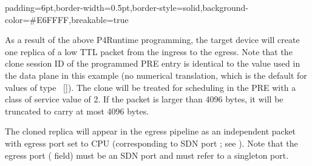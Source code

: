 \documentclass[11pt]{article}
\begin{document}
{%
\begin{mdbmargintb}{6pt}{6pt}%
\begin{mdblock}{padding=6pt,border-width=0.5pt,border-style=solid,background-color=\#E6FFFF,breakable=true}%
\begin{mdpre}%
\end{mdpre}%
\end{mdblock}%
\end{mdbmargintb}%

\noindent{}As a result of the above P4Runtime programming, the target device will create
one replica of a low TTL packet from the ingress to the egress. Note that the
clone session ID of the programmed PRE entry is identical to the value used in
the data plane in this example (no numerical translation, which is the default
for values of type ~[]). The clone will be
treated for scheduling in the PRE with a class of service value of 2. If the
packet is larger than 4096 bytes, it will be truncated to carry at most 4096
bytes.%

The cloned replica will appear in the egress pipeline as an independent packet
with egress port set to CPU (corresponding to SDN port ; see
). Note that the
egress port ( field) must be an SDN port and must refer to a singleton
port.%

}
\end{document}
